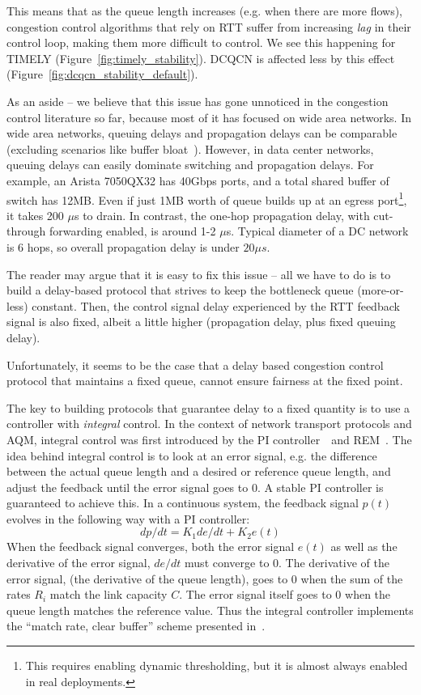 This means that as the queue length increases (e.g. when there are
more flows), congestion control algorithms that rely on RTT suffer from
increasing {\em lag} in their control loop, making them more difficult to control. We see this
happening for TIMELY (Figure~\ref{fig:timely_stability}). DCQCN is
affected less by  this
effect (Figure~\ref{fig:dcqcn_stability_default}).

As an aside -- we believe that this issue has gone unnoticed in the congestion
control literature so far, because most of it has focused on wide area networks.
In wide area networks, queuing delays and propagation delays can be comparable
(excluding scenarios like buffer bloat~\cite{bufferbloat}). However, in data
center networks, queuing delays can easily dominate switching and
propagation delays.  For example, an Arista 7050QX32 has 40Gbps ports, and a
total shared buffer of switch has 12MB. Even if just 1MB worth of queue builds
up at an egress port\footnote{This requires enabling dynamic thresholding, but it is
almost always enabled in real deployments.}, it takes 200 $\mu$s to drain. In contrast, the one-hop
propagation delay, with cut-through forwarding enabled, is around
1-2 $\mu$s.  Typical diameter of a DC network is 6 hops, so overall propagation
delay is under $20\mu s$.

The reader may argue that it is easy to fix this issue  -- all we have to do is
to build a delay-based protocol that strives to keep the  bottleneck queue
(more-or-less) constant. Then, the control signal delay experienced by the RTT
feedback signal is also fixed, albeit a little higher (propagation delay, plus
fixed queuing delay). 

Unfortunately, it seems to be the case that a delay based congestion control
protocol that maintains a fixed queue, cannot ensure fairness at the fixed point.

The key to building protocols that guarantee delay to a fixed quantity is to use
a controller with \emph{integral} control. In the context of network transport
protocols and AQM, integral control was first introduced by the PI
controller~\cite{hollot2001designing}~and REM~\cite{REM}.  The idea behind integral control
is to look at an error signal, e.g. the difference between the actual queue
length and a desired or reference queue length, and adjust the feedback until
the error signal goes to 0. A stable PI controller is guaranteed to achieve
this. In a continuous system, the feedback signal $p(t)$ evolves in the
following way with a PI controller:
$${dp}/{dt} = K_1 {de}/{dt}+K_2e(t)$$
When the feedback signal converges, both the error signal $e(t)$ as
well as the derivative of the error signal, $de/dt$ must converge to
0. The derivative of the error signal, (the derivative of the queue length), goes to 0
when the sum of the rates $R_i$ match the link capacity $C$. The error signal itself goes to 0
when the queue length matches the reference value. Thus the integral
controller implements the ``match rate, clear buffer'' scheme
presented in~\cite{REM}. 

